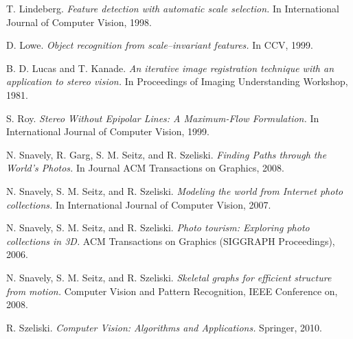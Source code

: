 \begin{thebibliography}{99}
  
  {\sc T. Lindeberg.} 
  \emph{Feature detection with automatic scale selection.}
  In International Journal of Computer Vision, 1998.

  {\sc D. Lowe.} 
  \emph{Object recognition from scale–invariant features.}
  In CCV, 1999.

  {\sc B. D. Lucas and T. Kanade. } 
  \emph{An iterative image registration technique with an application to stereo vision.}
  In Proceedings of Imaging Understanding Workshop, 1981.

  {\sc S. Roy.} 
  \emph{Stereo Without Epipolar Lines: A Maximum-Flow Formulation.}
  In International Journal of Computer Vision, 1999.

  {\sc N. Snavely, R. Garg, S. M. Seitz, and R. Szeliski.} 
  \emph{Finding Paths through the World's Photos.}
  In Journal ACM Transactions on Graphics, 2008.

  {\sc N. Snavely, S. M. Seitz, and R. Szeliski.} 
  \emph{Modeling the world from Internet photo collections.}
  In International Journal of Computer Vision, 2007.

  {\sc N. Snavely, S. M. Seitz, and R. Szeliski.} 
  \emph{Photo tourism: Exploring photo collections in 3D.}
  ACM Transactions on Graphics (SIGGRAPH Proceedings), 2006.

  {\sc N. Snavely, S. M. Seitz, and R. Szeliski.} 
  \emph{Skeletal graphs for efficient structure from motion.}
  Computer Vision and Pattern Recognition, IEEE Conference on, 2008.

  {\sc R. Szeliski.}
  \emph{Computer Vision: Algorithms and Applications.}
  Springer, 2010. 


\end{thebibliography}
